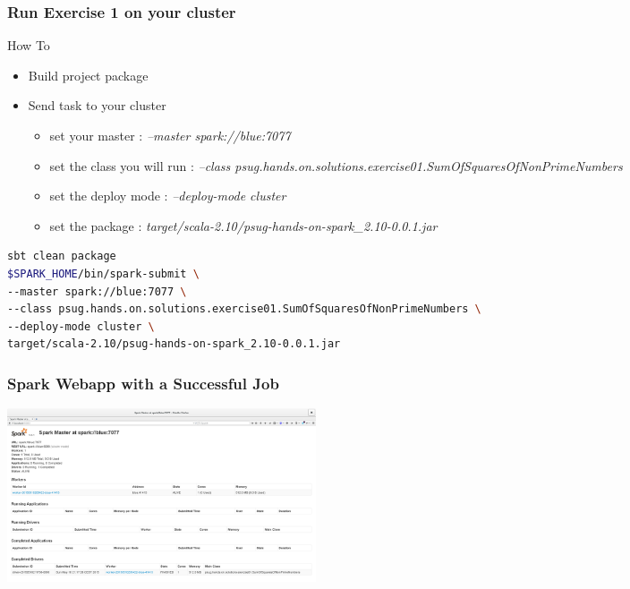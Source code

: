 \documentclass[slidetop,9pt,utf8]{beamer}
\begin{document}
\begin{CJK}{UTF8}{gbsn}
\begin{frame}
\end{frame}

\begin{frame}[fragile]

  \frametitle{Run Exercise 1 on your cluster}

  \begin{block}{How To}
    \begin{itemize}
      \item Build project package
      \item Send task to your cluster
      \begin{itemize}
        \item set your master : \textit{--master spark://blue:7077}
        \item set the class you will run : \textit{--class psug.hands.on.solutions.exercise01.SumOfSquaresOfNonPrimeNumbers}
        \item set the deploy mode : \textit{--deploy-mode cluster}
        \item set the package : \textit{target/scala-2.10/psug-hands-on-spark\_2.10-0.0.1.jar}
      \end{itemize}
    \end{itemize}
  \end{block}

  \begin{lstlisting}[language=bash, style=terminal-large]
sbt clean package
$SPARK_HOME/bin/spark-submit \ 
--master spark://blue:7077 \ 
--class psug.hands.on.solutions.exercise01.SumOfSquaresOfNonPrimeNumbers \ 
--deploy-mode cluster \ 
target/scala-2.10/psug-hands-on-spark_2.10-0.0.1.jar
  \end{lstlisting} 

\end{frame}

\begin{frame}

  \frametitle{Spark Webapp with a Successful Job}

  \includegraphics[width=345px]{images/spark_webapp_driver_success.png}


\end{frame}
\end{CJK}
\end{document}

